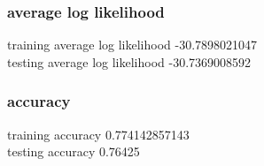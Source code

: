 \documentclass[letterpaper, 12]{article}
\begin{document}
\subsubsection{average log likelihood}
training average log likelihood -30.7898021047\\
testing average log likelihood -30.7369008592
\subsubsection{accuracy}
training accuracy 0.774142857143\\
testing accuracy 0.76425\\









\end{document}
